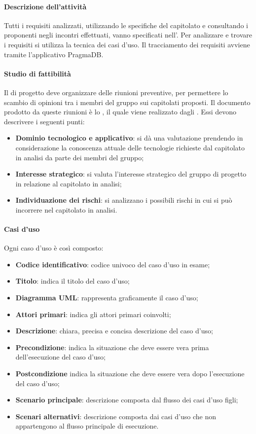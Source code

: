  \paragraph{Descrizione dell'attività}
 Tutti i requisiti analizzati, utilizzando le specifiche del capitolato e consultando i proponenti negli
incontri effettuati, vanno specificati nell'\ARdocRR. Per analizzare e trovare i
requisiti si utilizza la tecnica dei casi d'uso. Il tracciamento dei requisiti avviene tramite l'applicativo PragmaDB.
 \paragraph{Studio di fattibilità}
 Il \RESP{} di progetto deve organizzare delle riunioni preventive, per permettere lo scambio
di opinioni tra i membri del gruppo sui capitolati proposti. Il documento prodotto da queste
riunioni è lo \SFdocRR , il quale viene realizzato dagli \ANP{}. Essi devono
descrivere i seguenti punti: 
\begin{itemize}
 \item \textbf{Dominio tecnologico e applicativo}: si dà una valutazione prendendo in   considerazione
 la conoscenza attuale delle tecnologie richieste dal capitolato in analisi da parte dei membri  
del gruppo;
 \item \textbf{Interesse strategico}: si valuta l'interesse strategico del gruppo di progetto in relazione
al capitolato in analisi;
 \item \textbf{Individuazione dei rischi}: si analizzano i possibili rischi in cui si può incorrere nel
capitolato in analisi.
\end{itemize}
 \paragraph{Casi d'uso}
 Ogni caso d'uso è così composto:
 \begin{itemize}
  \item \textbf{Codice identificativo}: codice univoco del caso d'uso in esame;
  \item \textbf{Titolo}: indica il titolo del caso d'uso;
  \item \textbf{Diagramma UML}: rappresenta graficamente il caso d'uso;
  \item \textbf{Attori primari}: indica gli attori primari coinvolti;
  \item \textbf{Descrizione}: chiara, precisa e concisa descrizione del caso d'uso;
  \item \textbf{Precondizione}: indica la situazione che deve essere vera prima dell'esecuzione del caso d'uso;
  \item \textbf{Postcondizione} indica la situazione che deve essere vera dopo l'esecuzione del caso d'uso;
  \item \textbf{Scenario principale}: descrizione composta dal flusso dei casi d'uso figli;
  \item \textbf{Scenari alternativi}: descrizione composta dai casi d'uso che non appartengono al flusso
principale di esecuzione.
 \end{itemize}

